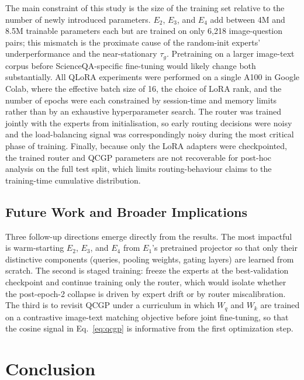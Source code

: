 \documentclass{article}
\begin{document}
The main constraint of this study is the size of the training set relative to the number of newly introduced parameters. $E_2$, $E_3$, and $E_4$ add between 4M and 8.5M trainable parameters each but are trained on only 6{,}218 image-question pairs; this mismatch is the proximate cause of the random-init experts' underperformance and the near-stationary $\tau_g$. Pretraining on a larger image-text corpus before ScienceQA-specific fine-tuning would likely change both substantially. All QLoRA experiments were performed on a single A100 in Google Colab, where the effective batch size of 16, the choice of LoRA rank, and the number of epochs were each constrained by session-time and memory limits rather than by an exhaustive hyperparameter search. The router was trained jointly with the experts from initialisation, so early routing decisions were noisy and the load-balancing signal was correspondingly noisy during the most critical phase of training. Finally, because only the LoRA adapters were checkpointed, the trained router and QCGP parameters are not recoverable for post-hoc analysis on the full test split, which limits routing-behaviour claims to the training-time cumulative distribution.

\subsection{Future Work and Broader Implications}

Three follow-up directions emerge directly from the results. The most impactful is warm-starting $E_2$, $E_3$, and $E_4$ from $E_1$'s pretrained projector so that only their distinctive components (queries, pooling weights, gating layers) are learned from scratch. The second is staged training: freeze the experts at the best-validation checkpoint and continue training only the router, which would isolate whether the post-epoch-2 collapse is driven by expert drift or by router miscalibration. The third is to revisit QCGP under a curriculum in which $W_q$ and $W_k$ are trained on a contrastive image-text matching objective before joint fine-tuning, so that the cosine signal in Eq.~\ref{eq:qcgp} is informative from the first optimization step. 

\section{Conclusion}
\end{document}
